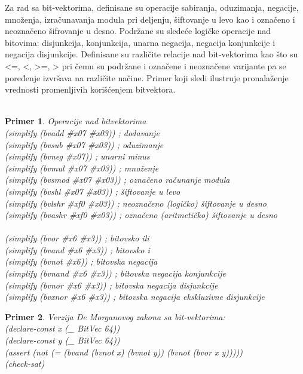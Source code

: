 \documentclass[12pt,oneside]{memoir}
\newtheorem{primer}{Primer}
\begin{document}
Za rad sa bit-vektorima, definisane su operacije sabiranja, oduzimanja, negacije, množenja, izračunavanja modula pri deljenju, šiftovanje u levo kao i označeno i neoznačeno šifrovanje u desno. Podržane su sledeće logičke operacije nad bitovima: disjunkcija, konjunkcija, unarna negacija, negacija konjunkcije i negacija disjunkcije. Definisane su različite relacije nad bit-vektorima kao što su <=, <, >=, > pri čemu su podržane i označene i neoznačene varijante pa se poređenje izvršava na različite načine. Primer koji sledi ilustruje pronalaženje vrednosti promenljivih korišćenjem bitvektora. 
\\
\\
\begin{primer} Operacije nad bitvektorima
\\(simplify (bvadd \#x07 \#x03)) ; dodavanje
\\(simplify (bvsub \#x07 \#x03)) ; oduzimanje
\\(simplify (bvneg \#x07)) ; unarni minus
\\(simplify (bvmul \#x07 \#x03)) ; množenje
\\(simplify (bvsmod \#x07 \#x03)) ; označeno računanje modula
\\(simplify (bvshl \#x07 \#x03)) ; šiftovanje u levo
\\(simplify (bvlshr \#xf0 \#x03)) ; neoznačeno (logičko) šiftovanje u desno
\\(simplify (bvashr \#xf0 \#x03)) ; označeno (aritmetičko) šiftovanje u desno
\\
\\(simplify (bvor \#x6 \#x3))   ; bitovsko ili
\\(simplify (bvand \#x6 \#x3))  ; bitovsko i
\\(simplify (bvnot \#x6)) ; bitovska negacija
\\(simplify (bvnand \#x6 \#x3)) ; bitovska negacija konjunkcije
\\(simplify (bvnor \#x6 \#x3)) ; bitovska negacija disjunkcije
\\(simplify (bvxnor \#x6 \#x3)) ; bitovska negacija ekskluzivne disjunkcije
\end{primer}


\begin{primer}
Verzija De Morganovog zakona sa bit-vektorima:
\\(declare-const x (\_ BitVec 64))
\\(declare-const y (\_ BitVec 64))
\\(assert (not (= (bvand (bvnot x) (bvnot y)) (bvnot (bvor x y)))))
\\(check-sat)
\end{primer}
\end{document}
